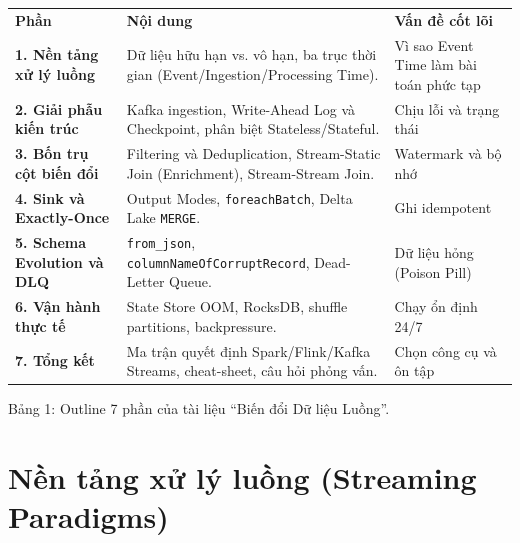 \documentclass[12pt]{article}
\begin{document}
\noindent
\begin{longtable}{@{}>{\RaggedRight\arraybackslash}p{3.4cm}>{\RaggedRight\arraybackslash}p{8.2cm}>{\RaggedRight\arraybackslash}p{4.0cm}@{}}
\rowcolor{rowLavender}
\textbf{Phần} & \textbf{Nội dung} & \textbf{Vấn đề cốt lõi} \\
\addlinespace[3pt]
\endhead

\textbf{1. Nền tảng xử lý luồng}
& Dữ liệu hữu hạn vs. vô hạn, ba trục thời gian (Event/Ingestion/Processing Time).
& Vì sao Event Time làm bài toán phức tạp \\
\addlinespace[6pt]

\textbf{2. Giải phẫu kiến trúc}
& Kafka ingestion, Write-Ahead Log và Checkpoint, phân biệt Stateless/Stateful.
& Chịu lỗi và trạng thái \\
\addlinespace[6pt]

\textbf{3. Bốn trụ cột biến đổi}
& Filtering và Deduplication, Stream-Static Join (Enrichment), Stream-Stream Join.
& Watermark và bộ nhớ \\
\addlinespace[6pt]

\textbf{4. Sink và Exactly-Once}
& Output Modes, \texttt{foreachBatch}, Delta Lake \texttt{MERGE}.
& Ghi idempotent \\
\addlinespace[6pt]

\textbf{5. Schema Evolution và DLQ}
& \texttt{from\_json}, \texttt{columnNameOfCorruptRecord}, Dead-Letter Queue.
& Dữ liệu hỏng (Poison Pill) \\
\addlinespace[6pt]

\textbf{6. Vận hành thực tế}
& State Store OOM, RocksDB, shuffle partitions, backpressure.
& Chạy ổn định 24/7 \\
\addlinespace[6pt]

\textbf{7. Tổng kết}
& Ma trận quyết định Spark/Flink/Kafka Streams, cheat-sheet, câu hỏi phỏng vấn.
& Chọn công cụ và ôn tập \\
\end{longtable}

\begin{captionbelowboxaivn}
Bảng 1: Outline 7 phần của tài liệu ``Biến đổi Dữ liệu Luồng''.
\end{captionbelowboxaivn}

\section{Nền tảng xử lý luồng (Streaming Paradigms)}
\end{document}

